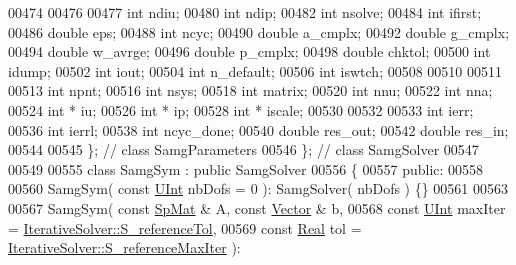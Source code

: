 \begin{DoxyCode}
00474 
00476 
00477         \textcolor{keywordtype}{int}    ndiu;
00480         \textcolor{keywordtype}{int}    ndip;
00482         \textcolor{keywordtype}{int}    nsolve;
00484         \textcolor{keywordtype}{int}    ifirst;
00486         \textcolor{keywordtype}{double} eps;
00488         \textcolor{keywordtype}{int}    ncyc;
00490         \textcolor{keywordtype}{double} a\_cmplx;
00492         \textcolor{keywordtype}{double} g\_cmplx;
00494         \textcolor{keywordtype}{double} w\_avrge;
00496         \textcolor{keywordtype}{double} p\_cmplx;
00498         \textcolor{keywordtype}{double} chktol;
00500         \textcolor{keywordtype}{int}    idump;
00502         \textcolor{keywordtype}{int}    iout;
00504         \textcolor{keywordtype}{int}    n\_default;
00506         \textcolor{keywordtype}{int}    iswtch;
00508 
00510 
00511 
00513         \textcolor{keywordtype}{int} npnt;
00516         \textcolor{keywordtype}{int} nsys;
00518         \textcolor{keywordtype}{int} matrix;
00520         \textcolor{keywordtype}{int} nnu;
00522         \textcolor{keywordtype}{int} nna;
00524         \textcolor{keywordtype}{int} * iu;
00526         \textcolor{keywordtype}{int} * ip;
00528         \textcolor{keywordtype}{int} * iscale;
00530 
00532 
00533         \textcolor{keywordtype}{int} ierr;
00536         \textcolor{keywordtype}{int} ierrl;
00538         \textcolor{keywordtype}{int} ncyc\_done;
00540         \textcolor{keywordtype}{double} res\_out;
00542         \textcolor{keywordtype}{double} res\_in;
00544 
00545     \}; \textcolor{comment}{// class SamgParameters}
00546 \}; \textcolor{comment}{// class SamgSolver}
00547 
00549 
00555 \textcolor{keyword}{class }SamgSym : \textcolor{keyword}{public} SamgSolver
00556 \{
00557 \textcolor{keyword}{public}:
00558 
00560     SamgSym( \textcolor{keyword}{const} \hyperlink{namespaceFVCode3D_a4bf7e328c75d0fd504050d040ebe9eda}{UInt} nbDofs = 0 ): SamgSolver( nbDofs ) \{\}
00561 
00563 
00567     SamgSym( \textcolor{keyword}{const} \hyperlink{namespaceFVCode3D_ac1032289d96638cf0ad6c52ef639095f}{SpMat} & A, \textcolor{keyword}{const} \hyperlink{namespaceFVCode3D_a16ccf345652402bccd1a5d2e6782526c}{Vector} & b,
00568              \textcolor{keyword}{const} \hyperlink{namespaceFVCode3D_a4bf7e328c75d0fd504050d040ebe9eda}{UInt} maxIter = \hyperlink{classFVCode3D_1_1IterativeSolver_a2afd68f254311907309444138d7f1b89}{IterativeSolver::S\_referenceTol},
00569              \textcolor{keyword}{const} \hyperlink{namespaceFVCode3D_a40c1f5588a248569d80aa5f867080e83}{Real} tol = \hyperlink{classFVCode3D_1_1IterativeSolver_a938effdbfaa21c23226bfedf904787c2}{IterativeSolver::S\_referenceMaxIter} ):

\end{DoxyCode}
